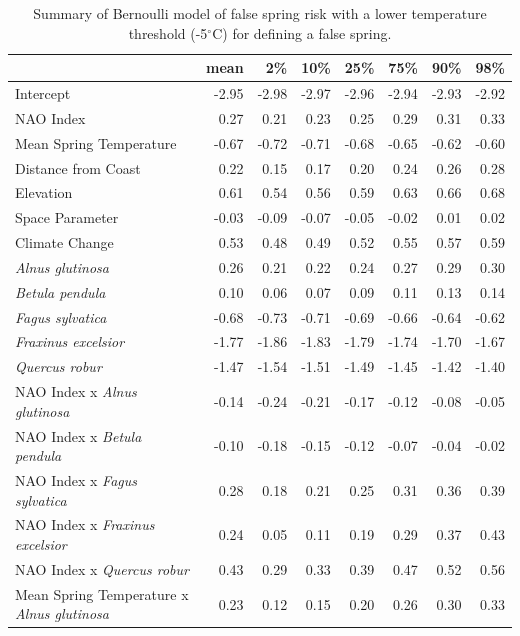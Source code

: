 \documentclass{article}\usepackage[]{graphicx}\usepackage[]{color}
\begin{document}
\newpage
\begin{longtable}{lrrrrrrr}
\caption{Summary of Bernoulli model of false spring risk with a lower temperature threshold (-5$^{\circ}$C) for defining a false spring.} \\ 
  \hline
 & mean & 2\% & 10\% & 25\% & 75\% & 90\% & 98\% \\ 
  \hline \endhead  \hline
Intercept & -2.95 & -2.98 & -2.97 & -2.96 & -2.94 & -2.93 & -2.92 \\ 
  NAO Index & 0.27 & 0.21 & 0.23 & 0.25 & 0.29 & 0.31 & 0.33 \\ 
  Mean Spring 
Temperature & -0.67 & -0.72 & -0.71 & -0.68 & -0.65 & -0.62 & -0.60 \\ 
  Distance from 
Coast & 0.22 & 0.15 & 0.17 & 0.20 & 0.24 & 0.26 & 0.28 \\ 
  Elevation & 0.61 & 0.54 & 0.56 & 0.59 & 0.63 & 0.66 & 0.68 \\ 
  Space Parameter & -0.03 & -0.09 & -0.07 & -0.05 & -0.02 & 0.01 & 0.02 \\ 
  Climate Change & 0.53 & 0.48 & 0.49 & 0.52 & 0.55 & 0.57 & 0.59 \\ 
  \textit{Alnus glutinosa} & 0.26 & 0.21 & 0.22 & 0.24 & 0.27 & 0.29 & 0.30 \\ 
  \textit{Betula pendula} & 0.10 & 0.06 & 0.07 & 0.09 & 0.11 & 0.13 & 0.14 \\ 
  \textit{Fagus sylvatica} & -0.68 & -0.73 & -0.71 & -0.69 & -0.66 & -0.64 & -0.62 \\ 
  \textit{Fraxinus excelsior} & -1.77 & -1.86 & -1.83 & -1.79 & -1.74 & -1.70 & -1.67 \\ 
  \textit{Quercus robur} & -1.47 & -1.54 & -1.51 & -1.49 & -1.45 & -1.42 & -1.40 \\ 
  NAO Index
x\textit{ Alnus glutinosa} & -0.14 & -0.24 & -0.21 & -0.17 & -0.12 & -0.08 & -0.05 \\ 
  NAO Index
x\textit{ Betula pendula} & -0.10 & -0.18 & -0.15 & -0.12 & -0.07 & -0.04 & -0.02 \\ 
  NAO Index
x\textit{ Fagus sylvatica} & 0.28 & 0.18 & 0.21 & 0.25 & 0.31 & 0.36 & 0.39 \\ 
  NAO Index
x\textit{ Fraxinus excelsior} & 0.24 & 0.05 & 0.11 & 0.19 & 0.29 & 0.37 & 0.43 \\ 
  NAO Index
x\textit{ Quercus robur} & 0.43 & 0.29 & 0.33 & 0.39 & 0.47 & 0.52 & 0.56 \\ 
  Mean Spring 
Temperature
x\textit{ Alnus glutinosa} & 0.23 & 0.12 & 0.15 & 0.20 & 0.26 & 0.30 & 0.33 \\ 

\end{longtable}
\end{document}
